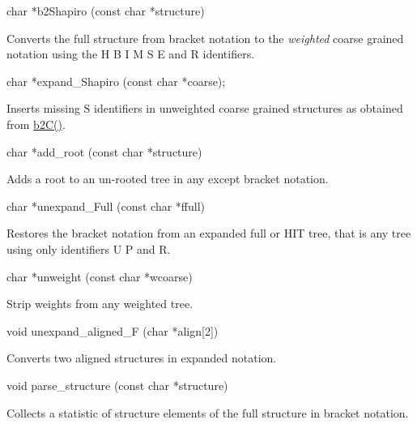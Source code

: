 \begin{DoxyVerb}char *b2Shapiro (const char *structure)
\end{DoxyVerb}
 Converts the full structure from bracket notation to the {\itshape weighted} coarse grained notation using the \textquotesingle{}H\textquotesingle{} \textquotesingle{}B\textquotesingle{} \textquotesingle{}I\textquotesingle{} \textquotesingle{}M\textquotesingle{} \textquotesingle{}S\textquotesingle{} \textquotesingle{}E\textquotesingle{} and \textquotesingle{}R\textquotesingle{} identifiers.

\begin{DoxyVerb}char  *expand_Shapiro (const char *coarse);
\end{DoxyVerb}
 Inserts missing \textquotesingle{}S\textquotesingle{} identifiers in unweighted coarse grained structures as obtained from \hyperlink{group__struct__utils_ga9c80d92391f2833549a8b6dac92233f0}{b2\+C()}.

\begin{DoxyVerb}char *add_root (const char *structure)
\end{DoxyVerb}
 Adds a root to an un-\/rooted tree in any except bracket notation.

\begin{DoxyVerb}char  *unexpand_Full (const char *ffull)
\end{DoxyVerb}
 Restores the bracket notation from an expanded full or H\+IT tree, that is any tree using only identifiers \textquotesingle{}U\textquotesingle{} \textquotesingle{}P\textquotesingle{} and \textquotesingle{}R\textquotesingle{}.

\begin{DoxyVerb}char  *unweight (const char *wcoarse)
\end{DoxyVerb}
 Strip weights from any weighted tree.

\begin{DoxyVerb}void   unexpand_aligned_F (char *align[2])
\end{DoxyVerb}
 Converts two aligned structures in expanded notation.

\begin{DoxyVerb}void   parse_structure (const char *structure)
\end{DoxyVerb}
 Collects a statistic of structure elements of the full structure in bracket notation.


